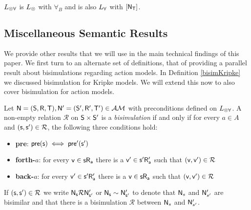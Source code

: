 $L_{\otimes\forall}$ is $L_{\otimes}$ with $\forall_B$ and is also $L_{\forall}$ with $[{\mathrm{\mathsf{N}}_\mathrm{\mathsf{T}}}]$.
%
%
%
%
%

\subsection{Miscellaneous Semantic Results}

We provide other results that we will use in the main technical findings of this paper.
We first turn to an alternate set of definitions, that of providing a parallel result about bisimulations regarding action models.
In Definition \ref{bisimKripke} we discussed bisimulation for Kripke models.
We will extend this now to also cover bisimulation for action models.

\begin{defn} \label{bisimEvent}
	Let $\mathrm{\mathsf{\mathrm{\mathsf{N}} = (S, R, T), \mathrm{\mathsf{N}}' = (S', R', T')}} \in \mathcal{AM}$ with preconditions defined on $L_{\otimes\forall}$.
	A non-empty relation $\mathcal{R}$ on $\mathrm{\mathsf{\mathrm{\mathsf{S}}}} \times \mathrm{\mathsf{\mathrm{\mathsf{S}}'}}$ is a {\em bisimulation} if and only if for every $a \in A$
	and $\mathrm{\mathsf{(s, s') \in \mathcal{R}}}$, the following three conditions hold:
	\begin{itemize}
		\item {\bf pre}: $\mathrm{\mathsf{pre(s)}} \iff \mathrm{\mathsf{pre'(s')}}$
		\item {\bf forth-$a$}: for every $\mathrm{\mathsf{v \in s R_a}}$ there is a $\mathrm{\mathsf{v'
      \in s' R'_a}}$ such that $\mathrm{\mathsf{(v,v')}} \in \mathcal{R}$
		\item {\bf back-$a$}: for every $\mathrm{\mathsf{v' \in s' R'_a}}$ there is a $\mathrm{\mathsf{v
      \in s R_a}}$ such that $\mathrm{\mathsf{(v,v')}} \in
		\mathcal{R}$
	\end{itemize}
	If $\mathrm{\mathsf{(s, s') \in \mathcal{R}}}$ we write $\mathrm{\mathsf{\mathrm{\mathsf{N}}_s \mathcal{R} \mathrm{\mathsf{N}}'_{s'}}}$ or
	$\mathrm{\mathsf{\mathrm{\mathsf{N}}_s \sim \mathrm{\mathsf{N}}'_{s'}}}$ to
  denote that $\mathrm{\mathsf{N}}_s$ and $\mathrm{\mathsf{N}}'_{s'}$ are bisimilar and
	that there is a bisimulation $\mathcal{R}$ between $\mathrm{\mathsf{N}}_s$ and $\mathrm{\mathsf{N}}'_{s'}$.
\end{defn}

